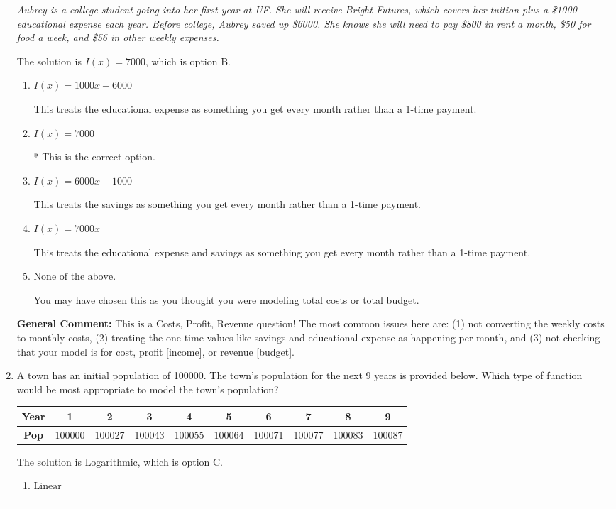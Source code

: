 \documentclass{extbook}[14pt]
\newcommand{\litem}[1]{\item #1

\rule{\textwidth}{0.4pt}}
\begin{document}
\begin{enumerate}
{\begin{center}
    \textit{ Aubrey is a college student going into her first year at UF. She will receive Bright Futures, which covers her tuition plus a \$1000 educational expense each year. Before college, Aubrey saved up \$6000. She knows she will need to pay \$800 in rent a month, \$50 for food a week, and \$56 in other weekly expenses. }
\end{center}
The solution is \( I(x) = 7000 \), which is option B.\begin{enumerate}[label=\Alph*.]
\item \( I(x) = 1000 x + 6000 \)

This treats the educational expense as something you get every month rather than a 1-time payment.
\item \( I(x) = 7000 \)

* This is the correct option.
\item \( I(x) = 6000 x + 1000 \)

This treats the savings as something you get every month rather than a 1-time payment.
\item \( I(x) = 7000 x \)

This treats the educational expense and savings as something you get every month rather than a 1-time payment.
\item \( \text{None of the above.} \)

You may have chosen this as you thought you were modeling total costs or total budget.
\end{enumerate}

\textbf{General Comment:} This is a Costs, Profit, Revenue question! The most common issues here are: (1) not converting the weekly costs to monthly costs, (2) treating the one-time values like savings and educational expense as happening per month, and (3) not checking that your model is for cost, profit [income], or revenue [budget].
}
\litem{
A town has an initial population of 100000. The town's population for the next 9 years is provided below. Which type of function would be most appropriate to model the town's population?


\begin{tabular}{c|c|c|c|c|c|c|c|c|c}
\textbf{Year} &1 &2 &3 &4 &5 &6 &7 &8 &9\tabularnewline \hline
\textbf{Pop} &100000 &100027 &100043 &100055 &100064 &100071 &100077 &100083 &100087\end{tabular}The solution is \( \text{Logarithmic} \), which is option C.\begin{enumerate}[label=\Alph*.]
\item \( \text{Linear} \)


\end{enumerate}}
\end{enumerate}
\end{document}
